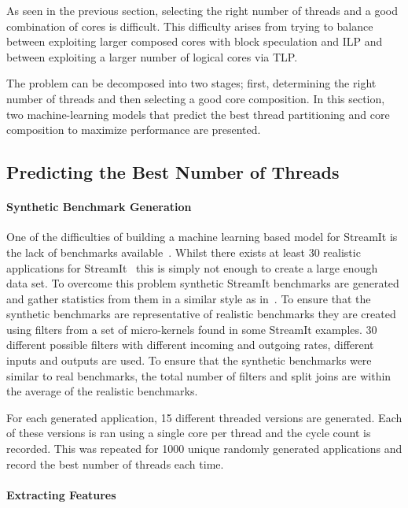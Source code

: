 As seen in the previous section, selecting the right number of threads and a good combination of cores is difficult.
This difficulty arises from trying to balance between exploiting larger composed cores with block speculation and ILP and between exploiting a larger number of logical cores via TLP.

The problem can be decomposed into two stages; first, determining the right number of threads and then selecting a good core composition.
In this section, two machine-learning models that predict the best thread partitioning and core composition to maximize performance are presented.

\subsection{Predicting the Best Number of Threads}

\paragraph{Synthetic Benchmark Generation}

One of the difficulties of building a machine learning based model for StreamIt is the lack of benchmarks available~\cite{wang2013partitionstreamit}.
Whilst there exists at least 30 realistic applications for StreamIt~\cite{theis2010empericalcharstreamit} this is simply not enough to create a large enough data set.
To overcome this problem synthetic StreamIt benchmarks are generated and gather statistics from them in a similar style as in~\cite{wang2013partitionstreamit}.
To ensure that the synthetic benchmarks are representative of realistic benchmarks they are created using filters from a set of micro-kernels found in some StreamIt examples.
30 different possible filters with different incoming and outgoing rates, different inputs and outputs are used.
To ensure that the synthetic benchmarks were similar to real benchmarks, the total number of filters and split joins are within the average of the realistic benchmarks.

For each generated application, 15 different threaded versions are generated.
Each of these versions is ran using a single core per thread and the cycle count is recorded.
This was repeated for 1000 unique randomly generated applications and record the best number of threads each time.

\paragraph{Extracting Features}


